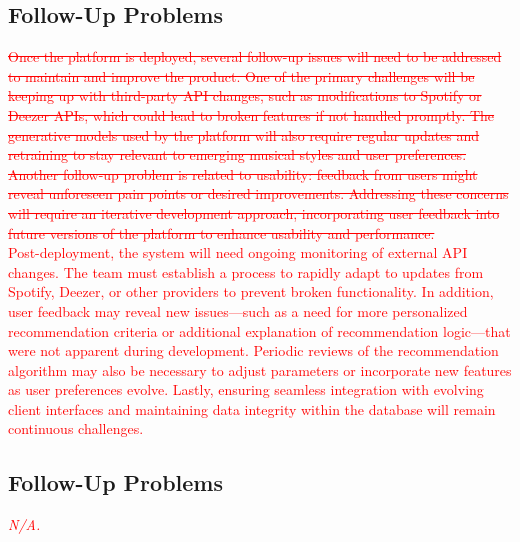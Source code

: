 \documentclass[12pt]{article}
\begin{document}
\subsection{Follow-Up Problems}

\textcolor{red}{\sout{Once the platform is deployed, several follow-up issues will need to be addressed to maintain and improve the product. One of the primary challenges will be 
keeping up with third-party API changes, such as modifications to Spotify or Deezer APIs, which could lead to broken features if not handled promptly. 
The generative models used by the platform will also require regular updates and retraining to stay relevant to emerging musical styles and user preferences.
 Another follow-up problem is related to usability: feedback from users might reveal unforeseen pain points or desired improvements. Addressing these concerns 
 will require an iterative development approach, incorporating user feedback into future versions of the platform to enhance usability and performance.}}\\

 \noindent\textcolor{red}{Post-deployment, the system will need ongoing monitoring of external API changes. The team must establish a process to rapidly adapt to updates from Spotify,
  Deezer, or other providers to prevent broken functionality. In addition, user feedback may reveal new issues—such as a need for more personalized recommendation 
  criteria or additional explanation of recommendation logic—that were not apparent during development. Periodic reviews of the recommendation algorithm may also
   be necessary to adjust parameters or incorporate new features as user preferences evolve. Lastly, ensuring seamless integration with evolving client interfaces 
   and maintaining data integrity within the database will remain continuous challenges.}


\subsection{Follow-Up Problems}
\textcolor{red}{\emph{N/A.}}
\end{document}

